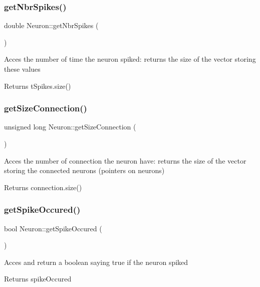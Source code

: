 \subsubsection{\texorpdfstring{get\+Nbr\+Spikes()}{getNbrSpikes()}}
{\footnotesize\ttfamily double Neuron\+::get\+Nbr\+Spikes (\begin{DoxyParamCaption}{ }\end{DoxyParamCaption})}

Acces the number of time the neuron spiked\+: returns the size of the vector storing these values \begin{DoxyReturn}{Returns}
t\+Spikes.\+size() 
\end{DoxyReturn}
\mbox{\label{class_neuron_a807d071a7f1149f9db0536af4f45e684}} 
\subsubsection{\texorpdfstring{get\+Size\+Connection()}{getSizeConnection()}}
{\footnotesize\ttfamily unsigned long Neuron\+::get\+Size\+Connection (\begin{DoxyParamCaption}{ }\end{DoxyParamCaption})}

Acces the number of connection the neuron have\+: returns the size of the vector storing the connected neurons (pointers on neurons) \begin{DoxyReturn}{Returns}
connection.\+size() 
\end{DoxyReturn}
\mbox{\label{class_neuron_a362d9688fd4da9d6edbd28f8691fb0dc}} 
\subsubsection{\texorpdfstring{get\+Spike\+Occured()}{getSpikeOccured()}}
{\footnotesize\ttfamily bool Neuron\+::get\+Spike\+Occured (\begin{DoxyParamCaption}{ }\end{DoxyParamCaption})}

Acces and return a boolean saying true if the neuron spiked \begin{DoxyReturn}{Returns}
spike\+Occured 
\end{DoxyReturn}
\mbox{\label{class_neuron_a13c081d437037dc7b63108e524f66fc7}} 
